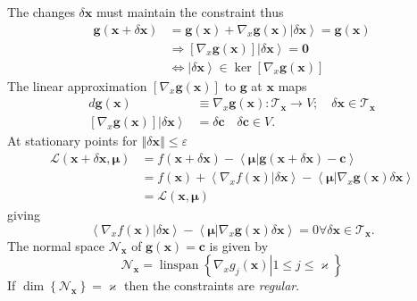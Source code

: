 \documentclass[aps,preprint]{revtex4}%
\begin{document}
The changes $\delta\boldsymbol{x}$ must maintain the constraint thus
\begin{align*}
\boldsymbol{g}\left(  \boldsymbol{x}+\delta\boldsymbol{x}\right)   &
=\boldsymbol{g}\left(  \boldsymbol{x}\right)  +\nabla_{x}\boldsymbol{g}\left(
\boldsymbol{x}\right)  \left\vert \delta\boldsymbol{x}\right\rangle
=\boldsymbol{g}\left(  \boldsymbol{x}\right) \\
&  \Rightarrow\left[  \nabla_{x}\boldsymbol{g}\left(  \boldsymbol{x}\right)
\right]  \left\vert \delta\boldsymbol{x}\right\rangle =\mathbf{0}\\
&  \Leftrightarrow\left\vert \delta\boldsymbol{x}\right\rangle \in\ker\left[
\nabla_{x}\boldsymbol{g}\left(  \boldsymbol{x}\right)  \right]
\end{align*}
The linear approximation $\left[  \nabla_{x}\boldsymbol{g}\left(
\boldsymbol{x}\right)  \right]  $ to $\boldsymbol{g}$ at $\boldsymbol{x}$
maps
\begin{align*}
d\boldsymbol{g}\left(  \boldsymbol{x}\right)   &  \equiv\nabla_{x}%
\boldsymbol{g}\left(  \boldsymbol{x}\right)  :\mathcal{T}_{\boldsymbol{x}%
}\rightarrow V;\quad\delta\boldsymbol{x}\in\mathcal{T}_{\boldsymbol{x}}\\
\left[  \nabla_{x}\boldsymbol{g}\left(  \boldsymbol{x}\right)  \right]
\left\vert \delta\boldsymbol{x}\right\rangle  &  =\delta\boldsymbol{c}%
\quad\delta\boldsymbol{c}\in V.
\end{align*}
At stationary points for $\left\Vert \delta\boldsymbol{x}\right\Vert
\leq\varepsilon$
\begin{align}
\mathcal{L}\left(  \boldsymbol{x}+\delta\boldsymbol{x,\mu}\right)   &
=f\left(  \boldsymbol{x}+\delta\boldsymbol{x}\right)  -\left\langle
\boldsymbol{\mu}\left\vert \boldsymbol{g}\left(  \boldsymbol{x}+\delta
\boldsymbol{x}\right)  -\boldsymbol{c}\right.  \right\rangle \nonumber\\
&  =f\left(  \boldsymbol{x}\right)  +\left\langle \left.  \nabla_{x}f\left(
\boldsymbol{x}\right)  \right\vert \delta\boldsymbol{x}\right\rangle
-\left\langle \boldsymbol{\mu}\left\vert \nabla_{x}\boldsymbol{g}\left(
\boldsymbol{x}\right)  \right.  \delta\boldsymbol{x}\right\rangle \nonumber\\
&  =\mathcal{L}\left(  \boldsymbol{x,\mu}\right)
\end{align}
giving%
\begin{equation}
\left\langle \left.  \nabla_{x}f\left(  \boldsymbol{x}\right)  \right\vert
\delta\boldsymbol{x}\right\rangle -\left\langle \boldsymbol{\mu}\left\vert
\nabla_{x}\boldsymbol{g}\left(  \boldsymbol{x}\right)  \right.  \delta
\boldsymbol{x}\right\rangle =0\forall\delta\boldsymbol{x\in}\mathcal{T}%
_{\boldsymbol{x}}.
\end{equation}
The normal space $\mathcal{N}_{\boldsymbol{x}}$ of $\boldsymbol{g}\left(
\boldsymbol{x}\right)  =\boldsymbol{c}$ is given by
\[
\mathcal{N}_{\boldsymbol{x}}=\operatorname{linspan}\left\{  \left.  \nabla
_{x}g_{j}\left(  \boldsymbol{x}\right)  \right\vert 1\leq j\leq\varkappa
\right\}
\]
If $\dim\left\{  \mathcal{N}_{\boldsymbol{x}}\right\}  =\varkappa$ then the
constraints are \emph{regular}.
\end{document}
